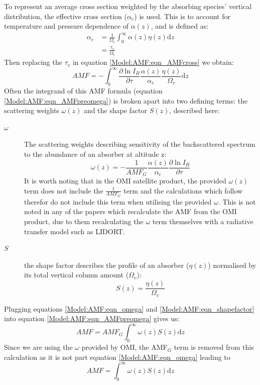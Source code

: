   To represent an average cross section weighted by the absorbing species' vertical distribution, the effective cross section ($\alpha_e$) is used.
  This is to account for temperature and pressure dependence of $\alpha(z)$, and is defined as:
  \begin{align*}
    \alpha_e &= \frac{1}{\Omega_v} \int_0^\infty \alpha(z) \eta(z) \mathrm{d}z \\
     &= \frac{\tau_v}{\Omega_v}
  \end{align*}
  Then replacing the $\tau_v$ in equation \ref{Model:AMF:eqn_AMFcross} we obtain:
  \begin{equation} \label{Model:AMF:eqn_AMFpreomega}
    AMF=-\int_0^\infty{ \frac{\partial \ln{I_B}}{\partial \tau} \frac{\alpha(z)}{\alpha_e} \frac{\eta(z)}{\Omega_v} \mathrm{d}z }
  \end{equation}
  Often the integrand of this AMF formula (equation \ref{Model:AMF:eqn_AMFpreomega}) is broken apart into two defining terms: the scattering weights $\omega(z)$ and the shape factor $S(z)$, described here:
  \begin{description}
    \item[$\omega$] The scattering weights describing sensitivity of the backscattered spectrum to the abundance of an absorber at altitude z:
    \begin{equation} \label{Model:AMF:eqn_omega}
      \omega(z) = -\frac{1}{AMF_G} \frac{\alpha(z)}{\alpha_e} \frac{\partial \ln{I_B}}{\partial \tau}
    \end{equation}
    It is worth noting that in the OMI satellite product, the provided $\omega(z)$ term does not include the $\frac{1}{AMF_G}$ term and the calculations which follow therefor do not include this term when utilising the provided $\omega$.
    This is not noted in any of the papers which recalculate the AMF from the OMI product, due to them recalculating the $\omega$ term themselves with a radiative transfer model such as LIDORT.
    \item[$S$] the shape factor describes the profile of an absorber ($\eta(z)$) normalised by its total vertical column amount ($\Omega_v$):
    \begin{equation} \label{Model:AMF:eqn_shapefactor}
      S(z) = \frac{\eta(z)}{\Omega_v}
    \end{equation}
  \end{description}
  
  Plugging equations \ref{Model:AMF:eqn_omega} and \ref{Model:AMF:eqn_shapefactor} into equation \ref{Model:AMF:eqn_AMFpreomega} gives us:
  \begin{equation} \label{Model:AMF:eqn_AMF_amfgintwSdz}
    AMF = AMF_G\int_0^\infty{ \omega(z) S(z) \mathrm{d}z}
  \end{equation}
  Since we are using the $\omega$ provided by OMI, the AMF$_G$ term is removed from this calculation as it is not part equation \ref{Model:AMF:eqn_omega} leading to 
  \begin{equation} \label{Model:AMF:eqn_AMF_intwSdz}
    AMF = \int_0^\infty{ \omega(z) S(z) \mathrm{d}z}
  \end{equation}
  
